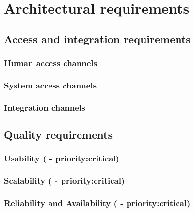 \documentclass[a4paper,11pt,titlepage]{article}
\begin{document}


\tableofcontents
\newpage

\section{Architectural requirements}
	
	\subsection{Access and integration requirements}
			\subsubsection{Human access channels}	
				
			\subsubsection{System access channels}
					
			\subsubsection{Integration channels}
				
\newpage			
 	\subsection{Quality requirements}
			
		\subsubsection{Usability ( - priority:critical)} \label{sec:usability}
			
			
		\subsubsection{Scalability ( - priority:critical)} \label{sec:scalability}
			
			
		\subsubsection{Reliability and Availability ( - priority:critical)} \label{sec:reliabilityavailability}
			
			
\end{document}
